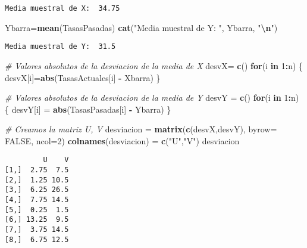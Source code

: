 \documentclass[
  a4paper,
  oneside,
  openany]{book}
\newenvironment{Shaded}{\begin{snugshade}}{\end{snugshade}}
\newcommand{\AttributeTok}[1]{\textcolor[rgb]{0.13,0.29,0.53}{#1}}
\newcommand{\CommentTok}[1]{\textcolor[rgb]{0.56,0.35,0.01}{\textit{#1}}}
\newcommand{\ConstantTok}[1]{\textcolor[rgb]{0.56,0.35,0.01}{#1}}
\newcommand{\ControlFlowTok}[1]{\textcolor[rgb]{0.13,0.29,0.53}{\textbf{#1}}}
\newcommand{\DecValTok}[1]{\textcolor[rgb]{0.00,0.00,0.81}{#1}}
\newcommand{\FunctionTok}[1]{\textcolor[rgb]{0.13,0.29,0.53}{\textbf{#1}}}
\newcommand{\NormalTok}[1]{#1}
\newcommand{\OtherTok}[1]{\textcolor[rgb]{0.56,0.35,0.01}{#1}}
\newcommand{\SpecialCharTok}[1]{\textcolor[rgb]{0.81,0.36,0.00}{\textbf{#1}}}
\newcommand{\StringTok}[1]{\textcolor[rgb]{0.31,0.60,0.02}{#1}}
\begin{document}
\begin{verbatim}
Media muestral de X:  34.75 
\end{verbatim}

\begin{Shaded}
\begin{Highlighting}[]
\NormalTok{Ybarra}\OtherTok{=}\FunctionTok{mean}\NormalTok{(TasasPasadas)}
\FunctionTok{cat}\NormalTok{(}\StringTok{"Media muestral de Y: "}\NormalTok{, Ybarra, }\StringTok{"}\SpecialCharTok{\textbackslash{}n}\StringTok{"}\NormalTok{)}
\end{Highlighting}
\end{Shaded}

\begin{verbatim}
Media muestral de Y:  31.5 
\end{verbatim}

\begin{Shaded}
\begin{Highlighting}[]
\CommentTok{\# Valores absolutos de la desviacion de la media de X}
\NormalTok{desvX}\OtherTok{=} \FunctionTok{c}\NormalTok{()}
\ControlFlowTok{for}\NormalTok{(i }\ControlFlowTok{in} \DecValTok{1}\SpecialCharTok{:}\NormalTok{n) \{}
\NormalTok{  desvX[i]}\OtherTok{=}\FunctionTok{abs}\NormalTok{(TasasActuales[i] }\SpecialCharTok{{-}}\NormalTok{ Xbarra)}
\NormalTok{\}}

\CommentTok{\# Valores absolutos de la desviacion de la media de Y}
\NormalTok{desvY }\OtherTok{=} \FunctionTok{c}\NormalTok{()}
\ControlFlowTok{for}\NormalTok{(i }\ControlFlowTok{in} \DecValTok{1}\SpecialCharTok{:}\NormalTok{n) \{}
\NormalTok{  desvY[i] }\OtherTok{=} \FunctionTok{abs}\NormalTok{(TasasPasadas[i] }\SpecialCharTok{{-}}\NormalTok{ Ybarra)}
\NormalTok{\}}

\CommentTok{\# Creamos la matriz U, V}
\NormalTok{desviacion }\OtherTok{=} \FunctionTok{matrix}\NormalTok{(}\FunctionTok{c}\NormalTok{(desvX,desvY), }\AttributeTok{byrow=} \ConstantTok{FALSE}\NormalTok{, }\AttributeTok{ncol=}\DecValTok{2}\NormalTok{)}
\FunctionTok{colnames}\NormalTok{(desviacion) }\OtherTok{=} \FunctionTok{c}\NormalTok{(}\StringTok{"U"}\NormalTok{,}\StringTok{"V"}\NormalTok{)}
\NormalTok{desviacion}
\end{Highlighting}
\end{Shaded}

\begin{verbatim}
         U    V
[1,]  2.75  7.5
[2,]  1.25 10.5
[3,]  6.25 26.5
[4,]  7.75 14.5
[5,]  0.25  1.5
[6,] 13.25  9.5
[7,]  3.75 14.5
[8,]  6.75 12.5
\end{verbatim}
\end{document}
